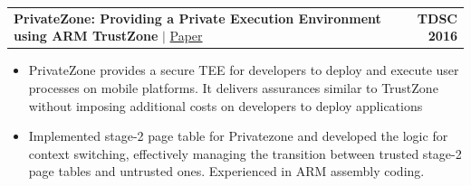 \documentclass[letterpaper,11pt]{article}
\makeatletter
\newcommand{\resumeItem}[1]{
  \item\small{#1}
}
\newcommand{\resumeProjectHeadingWithLabel}[3]{
    \item
    \begin{tabular*}{1.00\textwidth}{l@{\extracolsep{\fill}}r}
      {\small#1} & \textbf{\small #2} \\
    \end{tabular*}\vspace{-2pt}\label{#3}
}
\newcommand{\resumeItemListStart}{\begin{itemize}[leftmargin=*, itemsep=1pt, topsep=1pt, parsep=0pt, partopsep=0pt]}
\newcommand{\resumeItemListEnd}{\end{itemize}\vspace{-4pt}}
\makeatother
\begin{document}
%
    \resumeProjectHeadingWithLabel
    {\textbf{PrivateZone: Providing a Private Execution Environment using ARM TrustZone} $|$ \href{https://cysec.kr/publications/PrivateZone_Providing_a_Private_Execution_Environment_using_ARM_TrustZone.pdf}{Paper}
    }{TDSC 2016}{paper:privateZone}
    \resumeItemListStart
        \resumeItem{PrivateZone provides a secure TEE for developers to deploy and execute user processes on mobile platforms. It delivers assurances similar to TrustZone without imposing additional costs on developers to deploy applications}
        \resumeItem{Implemented stage-2 page table for  Privatezone and developed the logic for context switching, effectively managing the transition between trusted stage-2 page tables and untrusted ones. Experienced in ARM assembly coding.}
        
    \resumeItemListEnd
\end{document}
